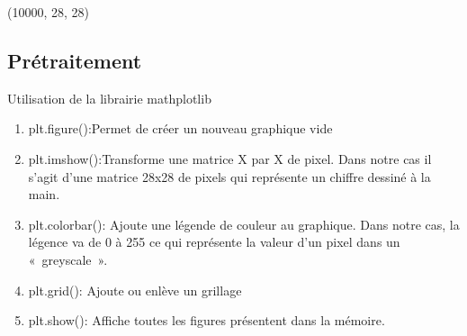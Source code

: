 \documentclass[letterpaper,10pt,french]{sphinxmanual}
\begin{document}
\begin{sphinxVerbatim}[commandchars=\\\{\}]
(10000, 28, 28)
\end{sphinxVerbatim}


\subsection{Prétraitement}
\label{\detokenize{OCR_SAM:pretraitement}}
Utilisation de la librairie mathplotlib
\begin{enumerate}
%
\item {} 
plt.figure():Permet de créer un nouveau graphique vide

\item {} 
plt.imshow():Transforme une matrice X par X de pixel. Dans notre cas il s’agit d’une matrice 28x28 de pixels qui représente un chiffre dessiné à la main.

\item {} 
plt.colorbar(): Ajoute une légende de couleur au graphique. Dans notre cas, la légence va de 0 à 255 ce qui représente la valeur d’un pixel dans un « greyscale ».

\item {} 
plt.grid(): Ajoute ou enlève un grillage

\item {} 
plt.show(): Affiche toutes les figures présentent dans la mémoire.

\end{enumerate}

\begin{sphinxVerbatim}[commandchars=\\\{\}]
\PYG{p}{[}\PYG{p}{]}
\end{sphinxVerbatim}

\noindent{}

\begin{sphinxVerbatim}[commandchars=\\\{\}]
\PYG{p}{[}\PYG{p}{]}
\end{sphinxVerbatim}
\end{document}
